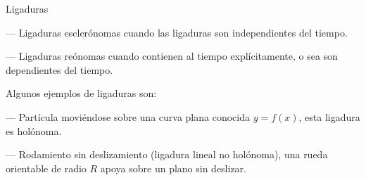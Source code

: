 \begin{myexampleblock}{Ligaduras}
\begin{adjustwidth}{20pt}{5pt}
\begin{adjustwidth}{20pt}{5pt}
\vspace{2mm} --- Ligaduras esclerónomas cuando las ligaduras son independientes del tiempo.

\vspace{2mm} --- Ligaduras reónomas cuando contienen al tiempo explícitamente, o sea son dependientes del tiempo.
\end{adjustwidth}
\end{adjustwidth}


\vspace{2mm} Algunos ejemplos de ligaduras son:

\begin{adjustwidth}{20pt}{5pt}
\vspace{2mm} --- Partícula moviéndose sobre una curva plana conocida $y = f(x)$, esta ligadura es holónoma.

\vspace{2mm} --- Rodamiento sin deslizamiento (ligadura lineal no holónoma), una rueda orientable de radio $R$ apoya sobre un plano sin deslizar.
\end{adjustwidth}
\vspace{2mm} 
	
\end{myexampleblock}
